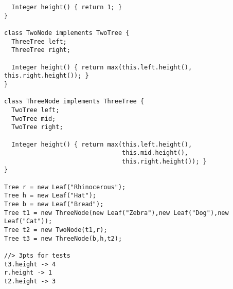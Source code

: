 \documentclass[12pt]{article}                   %
\newenvironment{solution}{\color{red}}{}
\begin{document}
\begin{problem}
\begin{solution}
\begin{verbatim}
  Integer height() { return 1; }
}

class TwoNode implements TwoTree {
  ThreeTree left;
  ThreeTree right;

  Integer height() { return max(this.left.height(), this.right.height()); }
}

class ThreeNode implements ThreeTree {
  TwoTree left;
  TwoTree mid;
  TwoTree right;

  Integer height() { return max(this.left.height(),
                                this.mid.height(),
                                this.right.height()); }
}

Tree r = new Leaf("Rhinocerous");
Tree h = new Leaf("Hat");
Tree b = new Leaf("Bread");
Tree t1 = new ThreeNode(new Leaf("Zebra"),new Leaf("Dog"),new Leaf("Cat"));
Tree t2 = new TwoNode(t1,r);
Tree t3 = new ThreeNode(b,h,t2);

//> 3pts for tests
t3.height -> 4
r.height -> 1
t2.height -> 3
\end{verbatim}
\end{solution}
\end{problem}
\newpage
\end{document}
